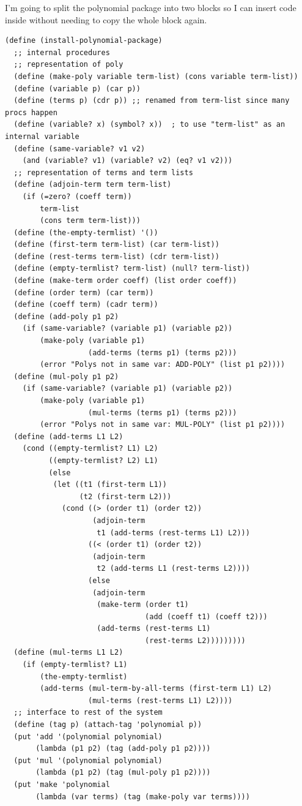 \documentclass[final,fleqn,titlepage,twoside]{article}
\begin{document}
I'm going to split the polynomial package into two blocks so I can insert code
inside without needing to copy the whole block again.

\begin{verbatim}
(define (install-polynomial-package)
  ;; internal procedures
  ;; representation of poly
  (define (make-poly variable term-list) (cons variable term-list))
  (define (variable p) (car p))
  (define (terms p) (cdr p)) ;; renamed from term-list since many procs happen
  (define (variable? x) (symbol? x))  ; to use "term-list" as an internal variable
  (define (same-variable? v1 v2)
    (and (variable? v1) (variable? v2) (eq? v1 v2)))
  ;; representation of terms and term lists
  (define (adjoin-term term term-list)
    (if (=zero? (coeff term))
        term-list
        (cons term term-list)))
  (define (the-empty-termlist) '())
  (define (first-term term-list) (car term-list))
  (define (rest-terms term-list) (cdr term-list))
  (define (empty-termlist? term-list) (null? term-list))
  (define (make-term order coeff) (list order coeff))
  (define (order term) (car term))
  (define (coeff term) (cadr term))
  (define (add-poly p1 p2)
    (if (same-variable? (variable p1) (variable p2))
        (make-poly (variable p1)
                   (add-terms (terms p1) (terms p2)))
        (error "Polys not in same var: ADD-POLY" (list p1 p2))))
  (define (mul-poly p1 p2)
    (if (same-variable? (variable p1) (variable p2))
        (make-poly (variable p1)
                   (mul-terms (terms p1) (terms p2)))
        (error "Polys not in same var: MUL-POLY" (list p1 p2))))
  (define (add-terms L1 L2)
    (cond ((empty-termlist? L1) L2)
          ((empty-termlist? L2) L1)
          (else
           (let ((t1 (first-term L1))
                 (t2 (first-term L2)))
             (cond ((> (order t1) (order t2))
                    (adjoin-term
                     t1 (add-terms (rest-terms L1) L2)))
                   ((< (order t1) (order t2))
                    (adjoin-term
                     t2 (add-terms L1 (rest-terms L2))))
                   (else
                    (adjoin-term
                     (make-term (order t1)
                                (add (coeff t1) (coeff t2)))
                     (add-terms (rest-terms L1)
                                (rest-terms L2)))))))))
  (define (mul-terms L1 L2)
    (if (empty-termlist? L1)
        (the-empty-termlist)
        (add-terms (mul-term-by-all-terms (first-term L1) L2)
                   (mul-terms (rest-terms L1) L2))))
  ;; interface to rest of the system
  (define (tag p) (attach-tag 'polynomial p))
  (put 'add '(polynomial polynomial)
       (lambda (p1 p2) (tag (add-poly p1 p2))))
  (put 'mul '(polynomial polynomial)
       (lambda (p1 p2) (tag (mul-poly p1 p2))))
  (put 'make 'polynomial
       (lambda (var terms) (tag (make-poly var terms))))
  
\end{verbatim}
\end{document}
